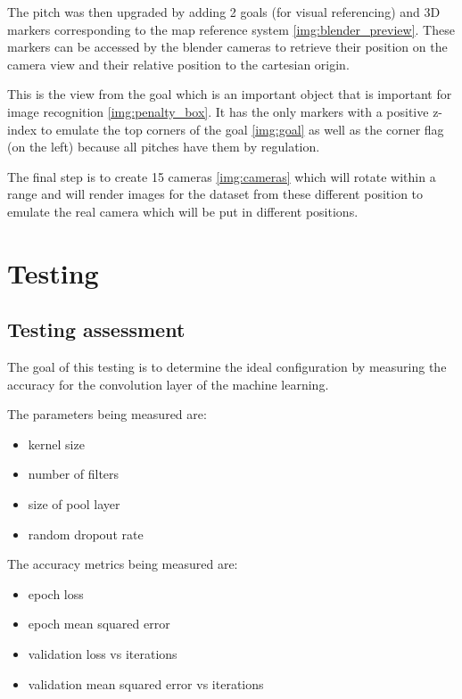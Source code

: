 \documentclass[
    11pt,
    oneside
]{report}
\begin{document}
The pitch was then upgraded by adding 2 goals (for visual referencing) and 3D markers corresponding to the map reference system \ref{img:blender_preview}. These markers can be accessed by the blender cameras to retrieve their position on the camera view and their relative position to the cartesian origin.



This is the view from the goal which is an important object that is important for image recognition \ref{img:penalty_box}. It has the only markers with a positive z-index to emulate the top corners of the goal \ref{img:goal} as well as the corner flag (on the left) because all pitches have them by regulation.



The final step is to create 15 cameras \ref{img:cameras} which will rotate within a range and will render images for the dataset from these different position to emulate the real camera which will be put in different positions.





\chapter{Testing}



\section{Testing assessment}


The goal of this testing is to determine the ideal configuration by measuring the accuracy for the convolution layer of the machine learning.

The parameters being measured are:
\begin{itemize}
    \item
      kernel size
    \item
      number of filters
    \item
      size of pool layer
    \item
      random dropout rate
\end{itemize}


The accuracy metrics being measured are:
\begin{itemize}
    \item
        epoch loss
    \item
        epoch mean squared error
    \item
        validation loss vs iterations
    \item
        validation mean squared error vs iterations
\end{itemize}
\end{document}
